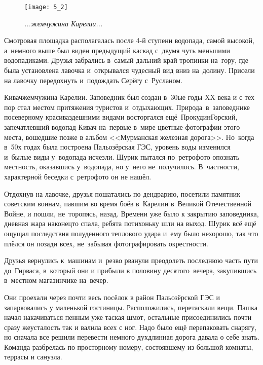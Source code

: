 \begin{wrapfigure}[21]{r}{0.5\textwidth}
	\centering
	\texttt{[image: 5\_2]}
	\caption{\small\textit{...жемчужина Карелии...}}
\end{wrapfigure} 

Смотровая площадка располагалась после 4-й ступени водопада, самой высокой, а~немного выше был виден предыдущий каскад с~двумя чуть меньшими водопадиками. Друзья забрались в~самый дальний край тропинки на~гору, где была установлена лавочка и~открывался чудесный вид вниз на~долину. Присели на лавочку передохнуть и~подождать Серёгу с~Русланом.

Кивач\mdash жемчужина Карелии. Заповедник был создан в~30\sdash ые годы XX века и с тех пор стал местом притяжения туристов и~отдыхающих. Природа~в~заповеднике по\sdash северному красива\mdash здешними видами восторгался ещё~Прокудин\sdash Горский, запечатлевший водопад Кивач на~первые в~мире цветные фотографии этого места, вошедшие позже в альбом <<Мурманская железная дорога>>. Но~когда в~50\sdash х годах была построена Пальозёрская ГЭС, уровень воды изменился и~былые виды у~водопада исчезли. Шурик пытался по~ретро\sdash фото\cite{ПрокудинГорский} опознать местность, оказавшись у~водопада, но у~него не~получилось. В~частности, характерной беседки с~ретро\sdash фото он не нашёл.

Отдохнув на лавочке, друзья пошатались по дендрарию, посетили памятник советским воинам, павшим во время боёв в~Карелии в~Великой Отечественной Войне, и пошли, не~торопясь, назад. Времени уже было к закрытию заповедника, дневная жара наконец\sdash то спала, ребята потихоньку шли на выход. Шурик всё ещё ощущал последствия полуденного теплового удара и~ему было нехорошо, так что плёлся он позади всех, не~забывая фотографировать окрестности. 

Друзья вернулись к~машинам и~резво рванули преодолеть последнюю часть пути до~Гирваса, в~который они и прибыли в половину десятого~вечера, закупившись в~местном магазинчике на~вечер.

Они проехали через почти весь посёлок в район Пальозёрской ГЭС и запарковались у маленькой гостиницы. Расположились, перетаскали вещи. Пашка начал накачиваться пенным уже таская шмот, остальные присоединились почти сразу же\mdash усталость так и валила всех с ног. Надо было ещё перепаковать снарягу, но сначала все решили перевести немного дух\mdash длинная дорога давала о себе знать. Команда разбрелась по просторному номеру, состоявшему из большой комнаты, террасы и санузла. 

